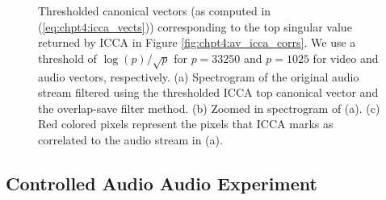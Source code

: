 \begin{figure}
\begin{center}
{    }
    \caption{Thresholded canonical vectors (as computed in (\ref{eq:chpt4:icca_vects}))
      corresponding to the top singular value returned by ICCA in Figure
      \ref{fig:chpt4:av_icca_corrs}. We use a threshold of $\log(p)/\sqrt{p}$ for
      $p=33250$ and $p=1025$ for video and audio vectors, respectively. (a) Spectrogram of
      the original audio stream filtered using the thresholded ICCA top canonical vector
      and the overlap-save filter method. (b) Zoomed in spectrogram of (a). (c) Red
      colored pixels represent the pixels that ICCA marks as correlated to the audio
      stream in (a).}
    \label{fig:chpt4:av_icca}
  \end{center}
\end{figure}


\subsection{Controlled Audio Audio Experiment}

